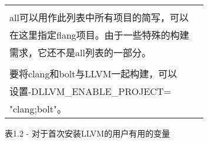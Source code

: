 \begin{longtable}{|l|l|}
\begin{tabular}[c]{@{}l@{}}
\\all可以用作此列表中所有项目的简写，可以\\ 在这里指定flang项目。由于一些特殊的构建\\ 需求，它还不是all列表的一部分。\\
\\
要将clang和bolt与LLVM一起构建，可以\\ 设置-DLLVM\_ENABLE\_PROJECT=\\ "clang;bolt"。
\end{tabular} \\ \hline
\end{longtable}

\begin{center}
表1.2 - 对于首次安装LLVM的用户有用的变量
\end{center}

